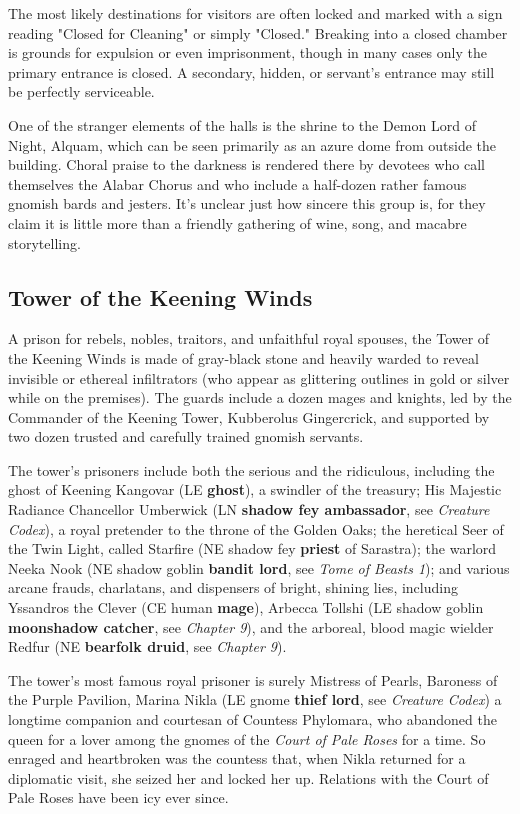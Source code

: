 \documentclass[10pt,a4paper,twoside,bg=print,twocolumn,openany,nodeprecatedcode]{dndbook}
\begin{document}
The most likely destinations for visitors are often locked and marked with a sign reading "Closed for Cleaning" or simply "Closed." Breaking into a closed chamber is grounds for expulsion or even imprisonment, though in many cases only the primary entrance is closed. A secondary, hidden, or servant's entrance may still be perfectly serviceable.

One of the stranger elements of the halls is the shrine to the Demon Lord of Night, Alquam, which can be seen primarily as an azure dome from outside the building. Choral praise to the darkness is rendered there by devotees who call themselves the Alabar Chorus and who include a half-dozen rather famous gnomish bards and jesters. It's unclear just how sincere this group is, for they claim it is little more than a friendly gathering of wine, song, and macabre storytelling.

\subsection{Tower of the Keening Winds}
A prison for rebels, nobles, traitors, and unfaithful royal spouses, the Tower of the Keening Winds is made of gray-black stone and heavily warded to reveal invisible or ethereal infiltrators (who appear as glittering outlines in gold or silver while on the premises). The guards include a dozen mages and knights, led by the Commander of the Keening Tower, Kubberolus Gingercrick, and supported by two dozen trusted and carefully trained gnomish servants.

The tower's prisoners include both the serious and the ridiculous, including the ghost of Keening Kangovar (LE \textbf{ghost}), a swindler of the treasury; His Majestic Radiance Chancellor Umberwick (LN \textbf{shadow fey ambassador}, see \textit{Creature Codex}), a royal pretender to the throne of the Golden Oaks; the heretical Seer of the Twin Light, called Starfire (NE shadow fey \textbf{priest} of Sarastra); the warlord Neeka Nook (NE shadow goblin \textbf{bandit lord}, see \textit{Tome of Beasts 1}); and various arcane frauds, charlatans, and dispensers of bright, shining lies, including Yssandros the Clever (CE human \textbf{mage}), Arbecca Tollshi (LE shadow goblin \textbf{moonshadow catcher}, see \textit{Chapter 9}), and the arboreal, blood magic wielder Redfur (NE \textbf{bearfolk druid}, see \textit{Chapter 9}).

The tower's most famous royal prisoner is surely Mistress of Pearls, Baroness of the Purple Pavilion, Marina Nikla (LE gnome \textbf{thief lord}, see \textit{Creature Codex}) a longtime companion and courtesan of Countess Phylomara, who abandoned the queen for a lover among the gnomes of the \textit{Court of Pale Roses} for a time. So enraged and heartbroken was the countess that, when Nikla returned for a diplomatic visit, she seized her and locked her up. Relations with the Court of Pale Roses have been icy ever since.
\end{document}
